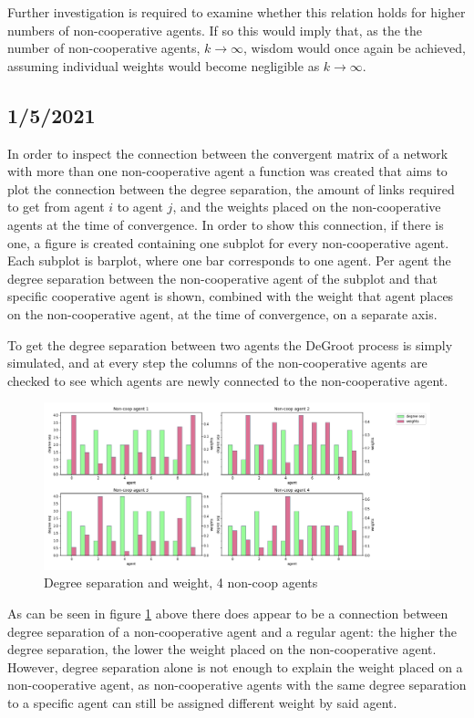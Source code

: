 \documentclass{article}
\begin{document}
Further investigation is required to examine whether this relation holds for higher numbers of non-cooperative agents. If so this would imply that, as the the number of non-cooperative agents, $k \to \infty$, wisdom would once again be achieved, assuming individual weights would become negligible as $k \to \infty$.

\newpage

\subsection{1/5/2021}

In order to inspect the connection between the convergent matrix of a network with more than one non-cooperative agent a function was created that aims to plot the connection between the degree separation, the amount of links required to get from agent $i$ to agent $j$, and the weights placed on the non-cooperative agents at the time of convergence.
In order to show this connection, if there is one, a figure is created containing one subplot for every non-cooperative agent. Each subplot is barplot, where one bar corresponds to one agent. Per agent the degree separation between the non-cooperative agent of the subplot and that specific cooperative agent is shown, combined with the weight that agent places on the non-cooperative agent, at the time of convergence, on a separate axis.

To get the degree separation between two agents the DeGroot process is simply simulated, and at every step the columns of the non-cooperative agents are checked to see which agents are newly connected to the non-cooperative agent.

\begin{center}
    \begin{figure}[!htbp]
        \centering
        \includegraphics[width=\textwidth]{ThesisKI/Images/SepWeight4.png}
        \caption{Degree separation and weight, 4 non-coop agents}
        \label{degree_sep_weight:4}
    \end{figure}
\end{center}

As can be seen in figure \ref{degree_sep_weight:4} above there does appear to be a connection between degree separation of a non-cooperative agent and a regular agent: the higher the degree separation, the lower the weight placed on the non-cooperative agent. However, degree separation alone is not enough to explain the weight placed on a non-cooperative agent, as non-cooperative agents with the same degree separation to a specific agent can still be assigned different weight by said agent.
\end{document}
